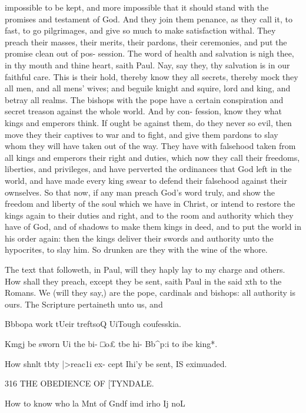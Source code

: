 \documentclass{custom}
\begin{document}
{impossible to be kept, and more impossible that it should 
stand with the promises and testament of God. And 
they join them penance, as they call it, to fast, to go 
pilgrimages, and give so much to make satisfaction withal. 
They preach their masses, their merits, their pardons, 
their ceremonies, and put the promise clean out of pos- 
session. The word of health and salvation is nigh thee, 
in thy mouth and thine heart, saith Paul. Nay, say they, 
thy salvation is in our faithful care. This is their 
hold, thereby know they all secrets, thereby mock 
they all men, and all mens' wives; and beguile knight 
and squire, lord and king, and betray all realms. The 
bishops with the pope have a certain conspiration and 
secret treason against the whole world. And by con- 
fession, know they what kings and emperors think. If 
ought be against them, do they never so evil, then move 
they their captives to war and to fight, and give them 
pardons to slay whom they will have taken out of the way. 
They have with falsehood taken from all kings and emperors 
their right and duties, which now they call their freedoms, 
liberties, and privileges, and have perverted the ordinances 
that God left in the world, and have made every king swear 
to defend their falsehood against their ownselves. So that 
now, if any man preach God's word truly, and show 
the freedom and liberty of the soul which we have 
in Christ, or intend to restore the kings again to their 
duties and right, and to the room and authority which 
they have of God, and of shadows to make them kings 
in deed, and to put the world in his order again: then the 
kings deliver their swords and authority unto the hypocrites, 
to slay him. So drunken are they with the wine of 
the whore. 

The text that followeth, in Paul, will they haply lay 
to my charge and others. How shall they preach, except 
they be sent, saith Paul in the said xth to the Romans. We 
(will they say,) are the pope, cardinals and bishops: all 
authority is ours. The Scripture pertaineth unto us, and 

Bbbopa 
work tUeir 
treftsoQ 
UiTough 
coufesskia. 

Kmgj be 
sworn Ui 
the bi- 
□o£ tbe hi- 
Bb^p:i to 
ibe king*. 

How shnlt 
tbty 
|>reac1i ex- 
cept Ihi'y 
be sent, IS 
eximuaded. 


316
THE OBEDIENCE OF
[TYNDALE.

How to 
know who 
la Mnt of 
Gndf imd 
irho Ij noL 

}
\end{document}

